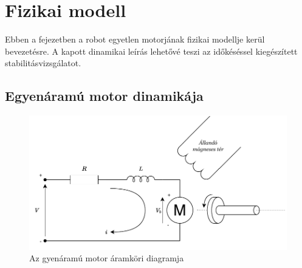 \chapter{Fizikai modell}\label{chap:physical_system}

Ebben a fejezetben a robot egyetlen motorjának fizikai modellje kerül bevezetésre. A kapott dinamikai leírás
lehetővé teszi az időkéséssel kiegészített stabilitásvizsgálatot. 

\section{Egyenáramú motor dinamikája}

\begin{figure}[h]
\begin{center}
\includegraphics[width=\textwidth]{images/motor_model_electric.pdf}
\caption{Az gyenáramú motor áramköri diagramja}
\label{fig:dc_motor_electric}
\end{center}
\end{figure}

